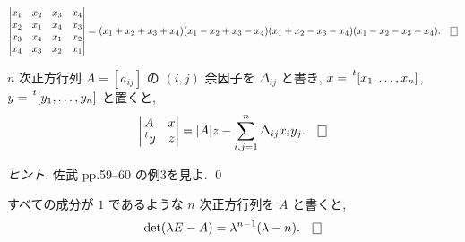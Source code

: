 \documentclass[12pt,twoside]{jarticle}
\begin{document}

\begin{question}
  \begin{equation*}
    \begin{vmatrix}
      x_1 & x_2 & x_3 & x_4 \\
      x_2 & x_1 & x_4 & x_3 \\
      x_3 & x_4 & x_1 & x_2 \\
      x_4 & x_3 & x_2 & x_1 \\
    \end{vmatrix}
    = 
    (x_1+x_2+x_3+x_4)(x_1-x_2+x_3-x_4)(x_1+x_2-x_3-x_4)(x_1-x_2-x_3-x_4).
    \qed
  \end{equation*}
\end{question}


\begin{question}[右下の縁に関する展開]
  $n$ 次正方行列 $A=[a_{ij}]$ の $(i,j)$ 余因子を $\Delta_{ij}$ と書き,
  $x=\tp{[x_1,\ldots,x_n]}$, $y=\tp{[y_1,\ldots,y_n]}$ と置くと,
  \begin{equation*}
    \begin{vmatrix}
      A      & x \\
      \tp{y} & z \\
    \end{vmatrix}
    = |A|z - \sum_{i,j=1}^n \Delta_{ij}x_iy_j.
    \qed
  \end{equation*}
\end{question}

\begin{proof}[ヒント]
  佐武 \cite{satake} pp.59--60 の例3を見よ. \qed
\end{proof}


\begin{question}
  すべての成分が $1$ であるような $n$ 次正方行列を $A$ と書くと,
  \begin{equation*}
    \det(\lambda E - A) = \lambda^{n-1}(\lambda - n).
    \qed
  \end{equation*}
\end{question}

\end{document}

